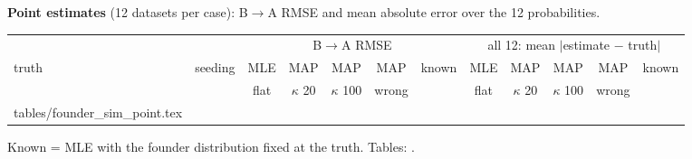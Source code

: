 \documentclass[10pt,a4paper]{article}
\makeatletter
\newcommand{\BA}{B$\to$A}
\newcommand{\tabinput}[1]{\@@input #1 }%
\makeatother
\begin{document}
\textbf{Point estimates} (12 datasets per case): \BA{} RMSE and mean absolute error over the 12 probabilities.
\begin{center}\scriptsize\setlength{\tabcolsep}{2.2pt}
\begin{tabular}{@{}llccccc|ccccc@{}}\toprule
 & & \multicolumn{5}{c|}{\BA{} RMSE} & \multicolumn{5}{c}{all 12: mean $|$estimate $-$ truth$|$} \\
truth & seeding & MLE & MAP & MAP & MAP & known & MLE & MAP & MAP & MAP & known \\
 & & flat & $\kappa$ 20 & $\kappa$ 100 & wrong & & flat & $\kappa$ 20 & $\kappa$ 100 & wrong & \\\midrule
\tabinput{tables/founder_sim_point.tex}\bottomrule
\end{tabular}

Known = MLE with the founder distribution fixed at the truth. Tables: .
\end{center}
\end{document}
